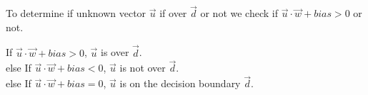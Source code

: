 \documentclass[professionalfont, a5paper]{article}
\begin{document}
To determine if unknown vector $\vec{u}$ if over $\vec{d}$ or not we check if $\vec{u}\cdot\vec{w}+bias>0$ or not.

If $\vec{u}\cdot\vec{w}+bias > 0$, $\vec{u}$ is over $\vec{d}$.\\
else If $\vec{u}\cdot\vec{w}+bias < 0$, $\vec{u}$ is not over $\vec{d}$.\\
else If $\vec{u}\cdot\vec{w}+bias = 0$, $\vec{u}$ is on the decision boundary $\vec{d}$.












\end{document}

